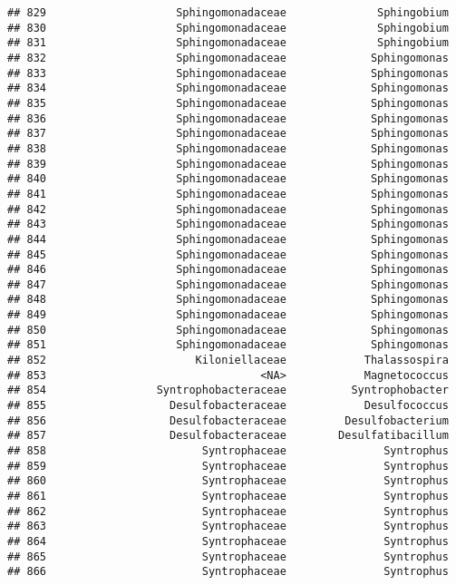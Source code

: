 \documentclass[
]{article}
\begin{document}
\begin{verbatim}
## 829                    Sphingomonadaceae              Sphingobium
## 830                    Sphingomonadaceae              Sphingobium
## 831                    Sphingomonadaceae              Sphingobium
## 832                    Sphingomonadaceae             Sphingomonas
## 833                    Sphingomonadaceae             Sphingomonas
## 834                    Sphingomonadaceae             Sphingomonas
## 835                    Sphingomonadaceae             Sphingomonas
## 836                    Sphingomonadaceae             Sphingomonas
## 837                    Sphingomonadaceae             Sphingomonas
## 838                    Sphingomonadaceae             Sphingomonas
## 839                    Sphingomonadaceae             Sphingomonas
## 840                    Sphingomonadaceae             Sphingomonas
## 841                    Sphingomonadaceae             Sphingomonas
## 842                    Sphingomonadaceae             Sphingomonas
## 843                    Sphingomonadaceae             Sphingomonas
## 844                    Sphingomonadaceae             Sphingomonas
## 845                    Sphingomonadaceae             Sphingomonas
## 846                    Sphingomonadaceae             Sphingomonas
## 847                    Sphingomonadaceae             Sphingomonas
## 848                    Sphingomonadaceae             Sphingomonas
## 849                    Sphingomonadaceae             Sphingomonas
## 850                    Sphingomonadaceae             Sphingomonas
## 851                    Sphingomonadaceae             Sphingomonas
## 852                       Kiloniellaceae            Thalassospira
## 853                                 <NA>            Magnetococcus
## 854                 Syntrophobacteraceae          Syntrophobacter
## 855                   Desulfobacteraceae            Desulfococcus
## 856                   Desulfobacteraceae         Desulfobacterium
## 857                   Desulfobacteraceae        Desulfatibacillum
## 858                        Syntrophaceae               Syntrophus
## 859                        Syntrophaceae               Syntrophus
## 860                        Syntrophaceae               Syntrophus
## 861                        Syntrophaceae               Syntrophus
## 862                        Syntrophaceae               Syntrophus
## 863                        Syntrophaceae               Syntrophus
## 864                        Syntrophaceae               Syntrophus
## 865                        Syntrophaceae               Syntrophus
## 866                        Syntrophaceae               Syntrophus

\end{verbatim}
\end{document}
